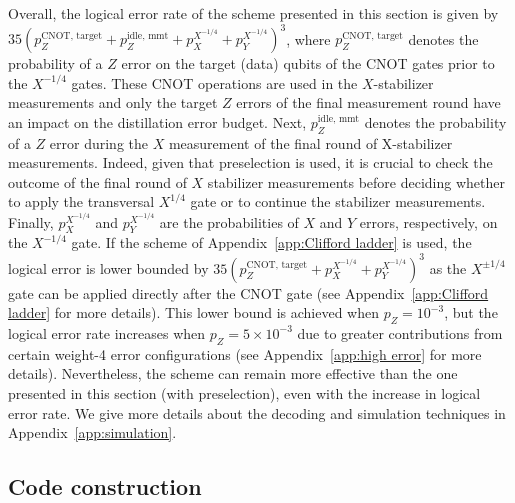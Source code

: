\documentclass[%
 reprint,
superscriptaddress,
 amsmath,amssymb,
 aps,
]{revtex4-2}
\begin{document}
Overall, the logical error rate of the scheme presented in this section is given by $35(p^{\text{CNOT, target}}_Z + p^{\text{idle, mmt}}_{Z} + p^{X^{-1/4}}_X + p^{X^{-1/4}}_Y)^3$, where $p^{\text{CNOT, target}}_Z$ denotes the probability of a $Z$ error on the target (data) qubits of the CNOT gates prior to the $X^{-1/4}$ gates. These CNOT operations are used in the $X$-stabilizer measurements and only the target $Z$ errors of the final measurement round have an impact on the distillation error budget. Next, $p^{\text{idle, mmt}}_{Z}$ denotes the probability of a $Z$ error during the $X$ measurement of the final round of X-stabilizer measurements. Indeed, given that preselection is used, it is crucial to check the outcome of the final round of $X$ stabilizer measurements before deciding whether to apply the transversal $X^{1/4}$ gate or to continue the stabilizer measurements. Finally, $p^{X^{-1/4}}_X$ and $p^{X^{-1/4}}_Y$ are the probabilities of $X$ and $Y$ errors, respectively, on the $X^{-1/4}$ gate. If the scheme of Appendix~\ref{app:Clifford ladder} is used, the logical error is lower bounded by $35(p^{\text{CNOT, target}}_Z + p^{X^{-1/4}}_X + p^{X^{-1/4}}_Y)^3$ as the $X^{\pm 1/4}$ gate can be applied directly after the CNOT gate (see Appendix~\ref{app:Clifford ladder} for more details). This lower bound is achieved when $p_Z = 10^{-3}$, but the logical error rate increases when $p_Z = 5 \times 10^{-3}$ due to greater contributions from certain weight-4 error configurations (see Appendix~\ref{app:high error} for more details). Nevertheless, the scheme can remain more effective than the one presented in this section (with preselection), even with the increase in logical error rate. We give more details about the decoding and simulation techniques in Appendix~\ref{app:simulation}.

\subsection{Code construction}
\end{document}
